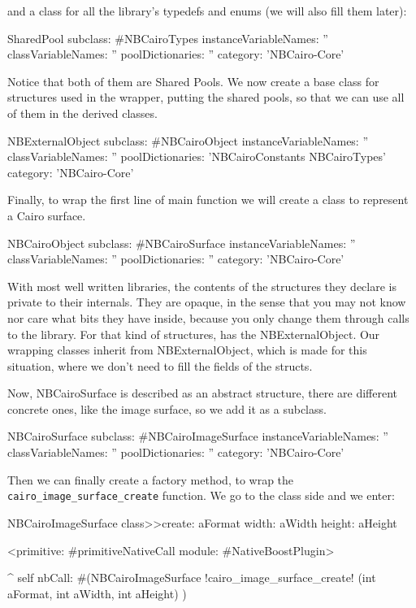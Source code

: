 \documentclass[a4paper,10pt,twoside]{book}
\begin{document}
and a class for all the library's typedefs and enums (we will
also fill them later):

\begin{classdef}{}
SharedPool subclass: #NBCairoTypes
	instanceVariableNames: ''
	classVariableNames: ''
	poolDictionaries: ''
	category: 'NBCairo-Core'
\end{classdef}

Notice that both of them are Shared Pools. We now create a base
class for structures used in the wrapper, putting the shared pools,
so that we can use all of them in the derived classes. 

\begin{classdef}{}
NBExternalObject subclass: #NBCairoObject
	instanceVariableNames: ''
	classVariableNames: ''
	poolDictionaries: 'NBCairoConstants NBCairoTypes'
	category: 'NBCairo-Core'
\end{classdef}

Finally, to wrap the first line of main function we will create a
class to represent a Cairo surface.

\begin{classdef}{}
NBCairoObject subclass: #NBCairoSurface
	instanceVariableNames: ''
	classVariableNames: ''
	poolDictionaries: ''
	category: 'NBCairo-Core'
\end{classdef}

With most well written libraries, the contents of the structures
they declare is private to their internals. They are opaque, in the
sense that you may not know nor care what bits they have inside,
because you only change them through calls to the library.
For that kind of structures, \NativeBoost has the NBExternalObject.
Our wrapping classes inherit from NBExternalObject, which is
made for this situation, where we don't need to fill the fields
of the structs.

Now, NBCairoSurface is described as an abstract structure, 
there are different concrete ones, like the image surface,
so we add it as a subclass.


\begin{classdef}{}
NBCairoSurface subclass: #NBCairoImageSurface
	instanceVariableNames: ''
	classVariableNames: ''
	poolDictionaries: ''
	category: 'NBCairo-Core'
\end{classdef}

Then we can finally create a factory method, to wrap the \verb|cairo_image_surface_create| function. We go to the class side and
we enter:

\begin{code}{}
NBCairoImageSurface class>>create: aFormat width: aWidth height: aHeight

	<primitive: #primitiveNativeCall module: #NativeBoostPlugin>
	
	^ self nbCall: #(NBCairoImageSurface !cairo\_image\_surface\_create! (int aFormat,
                                                         int aWidth,
                                                         int aHeight) )
\end{code}
\end{document}
